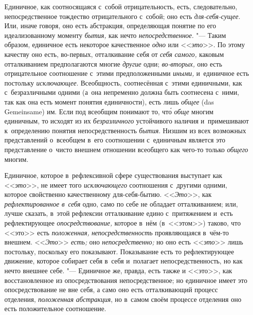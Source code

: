 Единичное, как соотносящаяся с~собой отрицательность, есть, следовательно,
непосредственное тождество отрицательного с~собой; оно есть
{\em для-себя-сущее}. Или, иначе говоря, оно есть абстракция, определяющая
понятие по его идеализованному моменту {\em бытия,} как нечто
{\em непосредственное}. "--- Таким образом, единичное есть некоторое
качественное {\em одно} или <<{\em это}>>. По этому качеству оно есть,
во-первых, отталкивание себя от {\em себя самого,} каковым отталкиванием
предполагаются многие {\em другие} одни; {\em во-вторых,} оно есть
отрицательное соотношение с~этими предположенными {\em иными,} и~единичное есть
постольку {\em исключающее}. Всеобщность, соотнесённая с~этими единичными, как
с~безразличными одними (а~она непременно должна быть соотнесена с~ними, так как
она есть момент понятия единичности), есть лишь {\em общее} (das Gemein\-same)
им. Если под всеобщим понимают то, чт\'{о} {\em обще} многим единичным, то
исходят из их {\em безразличного} устойчивого наличия и~примешивают
к~определению понятия непосредственность {\em бытия}. Низшим из всех возможных
представлений о~всеобщем в~его соотношении с~единичным является это
представление о~чисто внешнем отношении всеобщего как чего-то только
{\em общего} многим.

Единичное, которое в~рефлексивной сфере существования
выступает как <<{\em это}>>, не имеет того {\em исключающего}
соотношения с~другими одними, которое свойственно качественному для-себя-бытию.
<<{\em Это}>>, как {\em рефлектированное в~себя}
одно, само по себе не обладает отталкиванием; или, лучше
сказать, в~этой рефлексии отталкивание едино
с~притяжением и~есть рефлектирующее {\em опосредствование,}
которое в~нём (в~<<этом>>) таково, что <<это>> есть {\em положенная,}
{\em непосредственность} проявляющаяся в~чём-то внешнем. <<{\em Это}>>
{\em есть;} оно {\em непосредственно;} но оно есть <<{\em это}>> лишь
постольку, поскольку его показывают. Показывание есть то рефлектирующее
движение, которое собирает себя в~себя и~полагает непосредственность, но
как нечто внешнее себе. "--- Единичное же,
правда, есть также и <<это>>, как восстановленное из опосредствования
непосредственное; но единичное имеет это опосредствование не вне себя, а
само оно есть отталкивающий процесс отделения, {\em положенная
абстракция},
но в~самом своём процессе отделения оно есть положительное соотношение.


